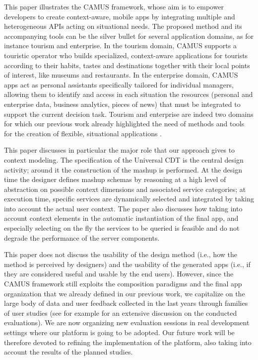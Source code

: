 \label{sec:conclusions}
This paper illustrates the CAMUS framework, whose aim is to empower developers to create context-aware, mobile apps by integrating multiple and heterogeneous APIs acting on situational needs. The  proposed method and its accompanying tools can be the silver bullet for several application domains, as for instance tourism and enterprise. In the tourism domain, CAMUS supports a touristic operator who builds  specialized, context-aware applications for tourists according to their habits, tastes and destinations together with their local points of interest, like museums and restaurants. In the enterprise domain, CAMUS apps act as  personal assistants specifically
tailored for individual managers, allowing them to identify and access in each situation the resources (personal and enterprise data,
business analytics, pieces of news) that must be integrated to support the current decision task. Tourism and enterprise are indeed two domains for which our previous work already highlighted the need of methods and tools for the creation of flexible, situational applications \cite{journals/TWEB2015/CappielloMP15}.

This paper discusses in particular the major role that our approach gives to context modeling. The specification of the Universal CDT is the central design activity; around it the construction of the mashup is performed. At the design time the designer defines mashup schemas by reasoning at a high level of abstraction on possible context dimensions and associated service categories; at execution time, specific services are dynamically selected and integrated by taking into account the actual user context. The paper also discusses how taking into account context elements in the automatic instantiation of the final app, and especially selecting on the fly the services to be queried is feasible and do not degrade the performance of the server components.

This paper does not discuss the usability of the design method (i.e., how the method is perceived by designers) and the usability of the generated apps (i.e., if they are considered useful and usable by the end users). However, since the CAMUS framework still exploits the composition paradigms and the final app organization that we already defined in our previous work, we capitalize on the large body of data and user feedback collected in the last years through families of user studies (see for example \cite{DBLP:journals/vlc/ArditoCDLMPP14,journals/TWEB2015/CappielloMP15} for an extensive discussion on the conducted evaluations). We are now organizing new evaluation sessions in real development settings where our platform is going to be adopted.
Our future work will be therefore devoted to refining the implementation of the platform, also taking into account the results of the planned studies.

